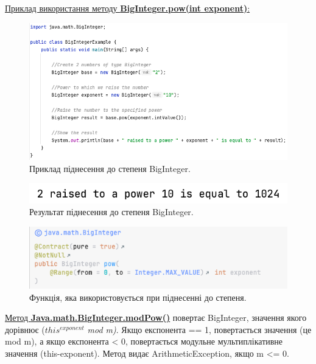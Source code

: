 \vspace{10pt}
\uline{Приклад використання методу \textbf{BigInteger.pow(int exponent)}:}
\begin{figure}[h]
     \centering
     \includegraphics[scale = 0.4]{../IMAGES/Java/BigInt_ex.png}
     \caption{Приклад піднесення до степеня BigInteger.}
     \label{fig_java_pow1}
\end{figure}

\begin{figure}[h]
     \centering
     \includegraphics[scale = 0.4]{../IMAGES/Java/BigInt_ex_output.png}
     \caption{Результат піднесення до степеня BigInteger.}
     \label{fig_java_pow2}
\end{figure}

\begin{figure}[h]
     \centering
     \includegraphics[scale = 0.5]{../IMAGES/Java/BigInt_ex_doc.png}
     \caption{Функція, яка використовується при піднесенні до степеня.}
     \label{fig_java_pow3}
\end{figure}

\newpage
\uline{Метод \textbf{Java.math.BigInteger.modPow()}} повертає BigInteger, значення якого дорівнює ($this^{exponent}$ \textit{mod m)}. Якщо експонента == 1, повертається значення (це mod m), а якщо експонента < 0, повертається модульне мультиплікативне значення (this-exponent). Метод видає ArithmeticException, якщо m <= 0.


